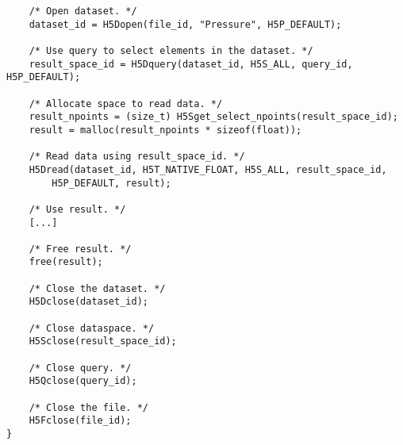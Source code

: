 {\begin{lstlisting}
    /* Open dataset. */
    dataset_id = H5Dopen(file_id, "Pressure", H5P_DEFAULT);

    /* Use query to select elements in the dataset. */
    result_space_id = H5Dquery(dataset_id, H5S_ALL, query_id, H5P_DEFAULT);

    /* Allocate space to read data. */ 
    result_npoints = (size_t) H5Sget_select_npoints(result_space_id);
    result = malloc(result_npoints * sizeof(float));

    /* Read data using result_space_id. */
    H5Dread(dataset_id, H5T_NATIVE_FLOAT, H5S_ALL, result_space_id,
        H5P_DEFAULT, result);

    /* Use result. */
    [...]

    /* Free result. */
    free(result);

    /* Close the dataset. */
    H5Dclose(dataset_id);

    /* Close dataspace. */
    H5Sclose(result_space_id);

    /* Close query. */
    H5Qclose(query_id);

    /* Close the file. */
    H5Fclose(file_id);
}
\end{lstlisting}
}


